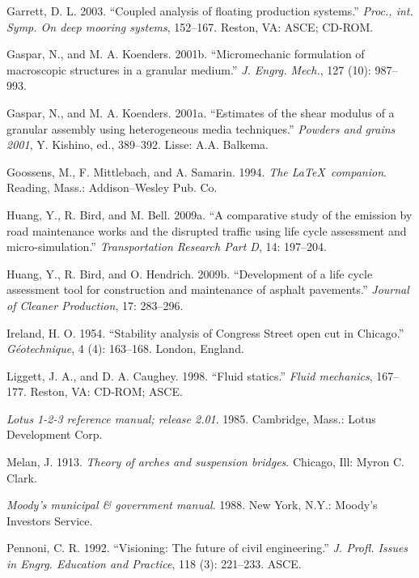 \documentclass[NewProceedings, InsideFigs,LineNumbers]{asce-quarto}
\newlength{\cslhangindent}
\newenvironment{CSLReferences}[2] %
 {\begin{list}{}{%
  \setlength{\itemindent}{0pt}
  \setlength{\leftmargin}{0pt}
  \setlength{\parsep}{0pt}
  \ifodd #1
   \setlength{\leftmargin}{\cslhangindent}
   \setlength{\itemindent}{-1\cslhangindent}
  \fi
  \setlength{\itemsep}{#2\baselineskip}}}
 {\end{list}}
\begin{document}
\begin{CSLReferences}{1}{0}
Garrett, D. L. 2003. {``Coupled analysis of floating production
systems.''} \emph{Proc., int. Symp. On deep mooring systems}, 152--167.
Reston, VA: ASCE; CD-ROM.

Gaspar, N., and M. A. Koenders. 2001b. {``Micromechanic formulation of
macroscopic structures in a granular medium.''} \emph{J. Engrg. Mech.},
127 (10): 987--993.

Gaspar, N., and M. A. Koenders. 2001a. {``Estimates of the shear modulus
of a granular assembly using heterogeneous media techniques.''}
\emph{Powders and grains 2001}, Y. Kishino, ed., 389--392. Lisse: A.A.
Balkema.

Goossens, M., F. Mittlebach, and A. Samarin. 1994. \emph{The
LaTeX~companion}. Reading, Mass.: Addison--Wesley Pub. Co.

Huang, Y., R. Bird, and M. Bell. 2009a. {``A comparative study of the
emission by road maintenance works and the disrupted traffic using life
cycle assessment and micro-simulation.''} \emph{Transportation Research
Part D}, 14: 197--204.

Huang, Y., R. Bird, and O. Hendrich. 2009b. {``Development of a life
cycle assessment tool for construction and maintenance of asphalt
pavements.''} \emph{Journal of Cleaner Production}, 17: 283--296.

Ireland, H. O. 1954. {``Stability analysis of {C}ongress {S}treet open
cut in {C}hicago.''} \emph{G{é}otechnique}, 4 (4): 163--168. London,
England.

Liggett, J. A., and D. A. Caughey. 1998. {``Fluid statics.''}
\emph{Fluid mechanics}, 167--177. Reston, VA: CD-ROM; ASCE.

\emph{Lotus 1-2-3 reference manual; release 2.01}. 1985. Cambridge,
Mass.: Lotus Development Corp.

Melan, J. 1913. \emph{Theory of arches and suspension bridges}. Chicago,
Ill: Myron C. Clark.

\emph{Moody's municipal \& government manual}. 1988. New York, N.Y.:
Moody's Investors Service.

Pennoni, C. R. 1992. {``Visioning: The future of civil engineering.''}
\emph{J. Profl. Issues in Engrg. Education and Practice}, 118 (3):
221--233. ASCE.


\end{CSLReferences}
\end{document}
